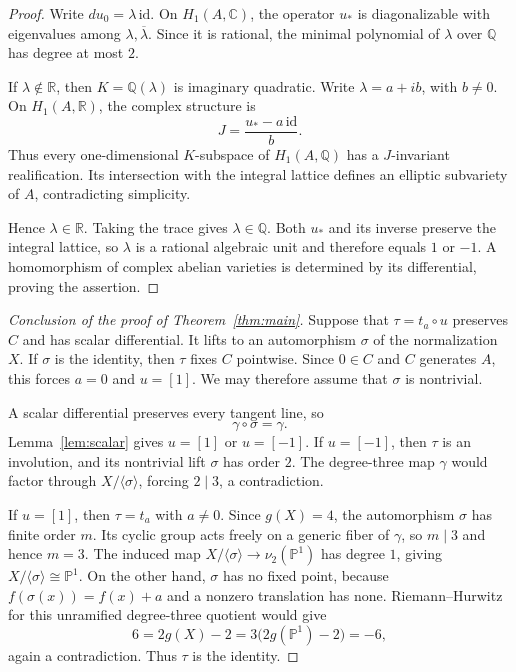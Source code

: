 \documentclass[11pt]{amsart}
\theoremstyle{remark}
\newcommand{\Q}{\mathbb Q}
\newcommand{\CC}{\mathbb C}
\newcommand{\PP}{\mathbb P}
\numberwithin{equation}{section}
\begin{document}
\begin{proof}
Write $du_0=\lambda\,\mathrm{id}$. On $H_1(A,\CC)$, the operator $u_*$
is diagonalizable with eigenvalues among $\lambda,\overline\lambda$.
Since it is rational, the minimal polynomial of $\lambda$ over $\Q$
has degree at most $2$.

If $\lambda\notin\mathbb R$, then $K=\Q(\lambda)$ is imaginary
quadratic. Write $\lambda=a+ib$, with $b\neq0$. On $H_1(A,\mathbb R)$,
the complex structure is
\[
J=\frac{u_*-a\,\mathrm{id}}{b}.
\]
Thus every one-dimensional $K$-subspace of $H_1(A,\Q)$ has a
$J$-invariant realification. Its intersection with the integral lattice
defines an elliptic subvariety of $A$, contradicting simplicity.

Hence $\lambda\in\mathbb R$. Taking the trace gives $\lambda\in\Q$.
Both $u_*$ and its inverse preserve the integral lattice, so $\lambda$
is a rational algebraic unit and therefore equals $1$ or $-1$. A
homomorphism of complex abelian varieties is determined by its
differential, proving the assertion.
\end{proof}

\begin{proof}[Conclusion of the proof of Theorem~\ref{thm:main}]
Suppose that $\tau=t_a\circ u$ preserves $C$ and has scalar
differential. It lifts to an automorphism $\sigma$ of the normalization
$X$. If $\sigma$ is the identity, then $\tau$ fixes $C$ pointwise.
Since $0\in C$ and $C$ generates $A$, this forces $a=0$ and $u=[1]$.
We may therefore assume that $\sigma$ is nontrivial.

A scalar differential preserves every tangent line, so
\[
\gamma\circ\sigma=\gamma.
\]
Lemma~\ref{lem:scalar} gives $u=[1]$ or $u=[-1]$. If $u=[-1]$, then
$\tau$ is an involution, and its nontrivial lift $\sigma$ has order
$2$. The degree-three map $\gamma$ would factor through
$X/\langle\sigma\rangle$, forcing $2\mid3$, a contradiction.

If $u=[1]$, then $\tau=t_a$ with $a\neq0$. Since $g(X)=4$, the
automorphism $\sigma$ has finite order $m$. Its cyclic group acts
freely on a generic fiber of $\gamma$, so $m\mid3$ and hence $m=3$.
The induced map $X/\langle\sigma\rangle\to\nu_2(\PP^1)$ has degree
$1$, giving $X/\langle\sigma\rangle\cong\PP^1$. On the other hand,
$\sigma$ has no fixed point, because
$f(\sigma(x))=f(x)+a$ and a nonzero translation has none.
Riemann--Hurwitz for this unramified degree-three quotient would give
\[
6=2g(X)-2=3\bigl(2g(\PP^1)-2\bigr)=-6,
\]
again a contradiction. Thus $\tau$ is the identity.
\end{proof}
\end{document}
